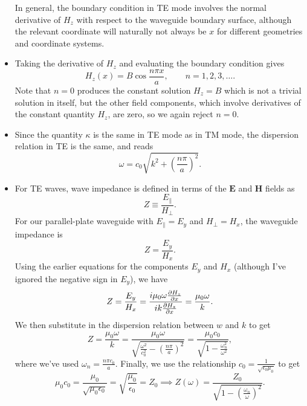 \documentclass[11pt, a4paper]{article}
\renewcommand{\vec}[1]{\bm{#1}} %
\newcommand{\E}{\vec{E}}  %
\renewcommand{\H}{\vec{H}}  %
\newcommand{\ee}{\epsilon_{0}}  %
\newcommand{\mm}{\mu_{0}}  %
\newcommand{\m}{\vec{m}}  %
\begin{document}
\begin{itemize}
	In general, the boundary condition in TE mode involves the normal derivative of $ H_{z} $ with respect to the waveguide boundary surface, although the relevant coordinate will naturally not always be $ x $ for different geometries and coordinate systems.
	
	\item Taking the derivative of $ H_{z} $ and evaluating the boundary condition gives
	\begin{equation*}
		H_{z}(x) = B\cos \frac{n\pi x}{a}, \qquad n = 1, 2, 3, \ldots.
	\end{equation*}
	Note that $ n = 0 $ produces the constant solution $ H_{z} = B $ which is not a trivial solution in itself, but the other field components, which involve derivatives of the constant quantity $ H_{z} $,  are zero, so we again reject $ n = 0 $. 
	
	\item Since the quantity $ \kappa $ is the same in TE mode as in TM mode, the dispersion relation in TE is the same, and reads
	\begin{equation*}
		\omega = c_{0}\sqrt{k^{2} + \left(\frac{n\pi}{a}\right)^{2}}.
	\end{equation*}
	
	\item For TE waves, wave impedance is defined in terms of the $ \E $ and $ \H $ fields as
	\begin{equation*}
		Z \equiv \frac{E_{\parallel}}{H_{\perp}}.
	\end{equation*}
	For our parallel-plate waveguide with $ E_{\parallel} = E_{y} $ and $ H_{\perp} = H_{x} $, the waveguide impedance is
	\begin{equation*}
		Z = \frac{E_{y}}{H_{x}}.
	\end{equation*}
	Using the earlier equations for the components $ E_{y} $ and $ H_{x} $ (although I've ignored the negative sign in $ E_{y} $), we have
	\begin{equation*}
		Z = \frac{E_{y}}{H_{x}} = \frac{i\mm \omega \pdv{H_{z}}{x}}{ik \pdv{H_{z}}{x}} = \frac{\mm \omega}{k}.
	\end{equation*}
	We then substitute in the dispersion relation between $ w $ and $ k $ to get
	\begin{equation*}
		Z = \frac{\mm \omega}{k} = \frac{\mm \omega}{\sqrt{\frac{\omega^{2}}{c_{0}^{2}} - \left(\frac{n\pi}{a}\right)^{2}}} = \frac{\mm c_{0}}{\sqrt{1 - \frac{\omega_{n}^{2}}{\omega^{2}}}},
	\end{equation*}
	where we've used $ \omega_{n} = \frac{n\pi c_{0}}{a} $. Finally, we use the relationship $ c_{0} = \frac{1}{\sqrt{\ee \mm}} $ to get
	\begin{equation*}
		\mm c_{0} = \frac{\mm}{\sqrt{\mm \ee}} = \sqrt{\frac{\mm}{\ee}} = Z_{0} \implies Z(\omega) = \frac{Z_{0}}{\sqrt{1 - \left(\frac{\omega_{n}}{\omega}\right)^{2}}}.
	\end{equation*}
	
\end{itemize}
\end{document}

